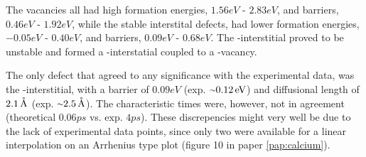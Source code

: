 The vacancies all had high formation energies, $1.56\unit{eV}$ - $2.83\unit{eV}$, and barriers, $0.46\unit{eV}$ - $1.92\unit{eV}$, while the stable interstital defects, had lower formation energies, $-0.05\unit{eV}$ - $0.40\unit{eV}$, and barriers, $0.09\unit{eV}$ - $0.68\unit{eV}$.
The -interstitial proved to be unstable and formed a -interstatial coupled to a -vacancy.

The only defect that agreed to any significance with the experimental data, was the -interstitial, with a barrier of $0.09\unit{eV}$ (exp. $\mytilde0.12\unit{eV}$) and diffusional length of $2.1\, \mathrm{\mathring{\mathrm{A}}}$ (exp. $\mytilde2.5\unit{\mAA}$).
The characteristic times were, however, not in agreement (theoretical $0.06\unit{ps}$ vs. exp. $4\unit{ps}$).
These discrepencies might very well be due to the lack of experimental data points, since only two were available for a linear interpolation on an Arrhenius type plot (figure 10 in paper \ref{pap:calcium}).
